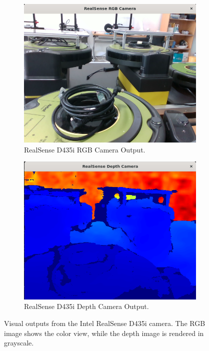 \documentclass{CSSRforAfrica}
\begin{document}
\begin{figure}[!hbpt]
	\centering
	\begin{subfigure}[b]{0.45\linewidth}
		\includegraphics[width=\linewidth]{images/realsense_rgb.png}
		\caption{RealSense D435i RGB Camera Output.}
		\label{fig:realsense_rgb_image}
	\end{subfigure}
	\hfill
	\begin{subfigure}[b]{0.45\linewidth}
		\includegraphics[width=\linewidth]{images/realsense_depth.png}
		\caption{RealSense D435i Depth Camera Output.}
		\label{fig:realsense_depth_image}
	\end{subfigure}
	\caption{Visual outputs from the Intel RealSense D435i camera. The RGB image shows the color view, while the depth image is rendered in grayscale.}
	\label{fig:realsense_camera_results}
\end{figure}
\end{document}
